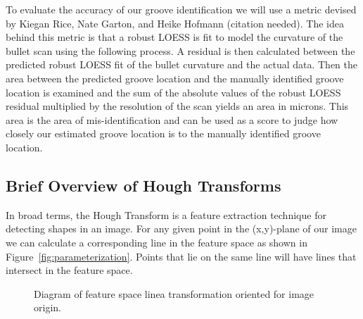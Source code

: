 \documentclass[12pt]{article}\usepackage[]{graphicx}\usepackage[]{color}
\theoremstyle{nonumberplain}
\newcommand{\hh}[1]{{\color{orange}{#1}}}
\begin{document}
To evaluate the accuracy of our groove identification we will use a metric devised by Kiegan Rice, Nate Garton, and Heike Hofmann (citation needed). The idea behind this metric is that a robust LOESS is fit to model the curvature of the bullet scan using the following process. A residual is then calculated between the predicted robust LOESS fit of the bullet curvature and the actual data. Then the area between the predicted groove location and the manually identified groove location is examined and the sum of the absolute values of the robust LOESS residual multiplied by the resolution of the scan yields an area in microns. This area is the area of mis-identification and can be used as a score to judge how closely our estimated groove location is to the manually identified groove location. 
\hh{ Discussion on resulting units and formula for loess needed}

\subsection{Brief Overview of Hough Transforms}


In broad terms, the Hough Transform is a feature extraction technique for detecting shapes in an image. For any given point in the (x,y)-plane of our image we can calculate a corresponding line in the feature space as shown in Figure~\ref{fig:parameterization}. Points that lie on the same line will have lines that intersect in the feature space. 
\begin{figure}[!ht]
\begin{subfigure}{.5\textwidth}
\centering
{}
\label{fig:tikz1}
\end{subfigure}
\begin{subfigure}{.5\textwidth}
\centering
{}
\label{fig:tikz2}
\end{subfigure}
\caption{Diagram of feature space linea transformation oriented for image origin.}
\label{fig:parametrization}
\end{figure}
\end{document}
